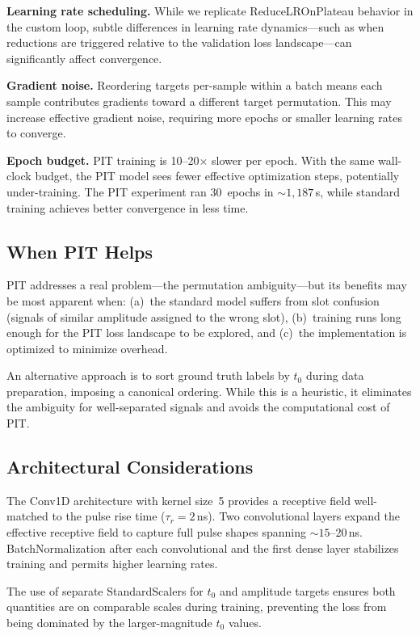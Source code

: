 \documentclass[11pt,twocolumn]{article}
\begin{document}
\textbf{Learning rate scheduling.}
While we replicate ReduceLROnPlateau behavior in the custom loop, subtle differences in learning rate dynamics---such as when reductions are triggered relative to the validation loss landscape---can significantly affect convergence.

\textbf{Gradient noise.}
Reordering targets per-sample within a batch means each sample contributes gradients toward a different target permutation.
This may increase effective gradient noise, requiring more epochs or smaller learning rates to converge.

\textbf{Epoch budget.}
PIT training is 10--20$\times$ slower per epoch.
With the same wall-clock budget, the PIT model sees fewer effective optimization steps, potentially under-training.
The PIT experiment ran 30~epochs in ${\sim}1{,}187$\,s, while standard training achieves better convergence in less time.

\subsection{When PIT Helps}

PIT addresses a real problem---the permutation ambiguity---but its benefits may be most apparent when:
(a)~the standard model suffers from slot confusion (signals of similar amplitude assigned to the wrong slot),
(b)~training runs long enough for the PIT loss landscape to be explored, and
(c)~the implementation is optimized to minimize overhead.

An alternative approach is to sort ground truth labels by $t_0$ during data preparation, imposing a canonical ordering.
While this is a heuristic, it eliminates the ambiguity for well-separated signals and avoids the computational cost of PIT.

\subsection{Architectural Considerations}

The Conv1D architecture with kernel size~5 provides a receptive field well-matched to the pulse rise time ($\tau_r = 2$\,ns).
Two convolutional layers expand the effective receptive field to capture full pulse shapes spanning ${\sim}15$--20\,ns.
BatchNormalization after each convolutional and the first dense layer stabilizes training and permits higher learning rates.

The use of separate StandardScalers for $t_0$ and amplitude targets ensures both quantities are on comparable scales during training, preventing the loss from being dominated by the larger-magnitude $t_0$ values.
\end{document}
